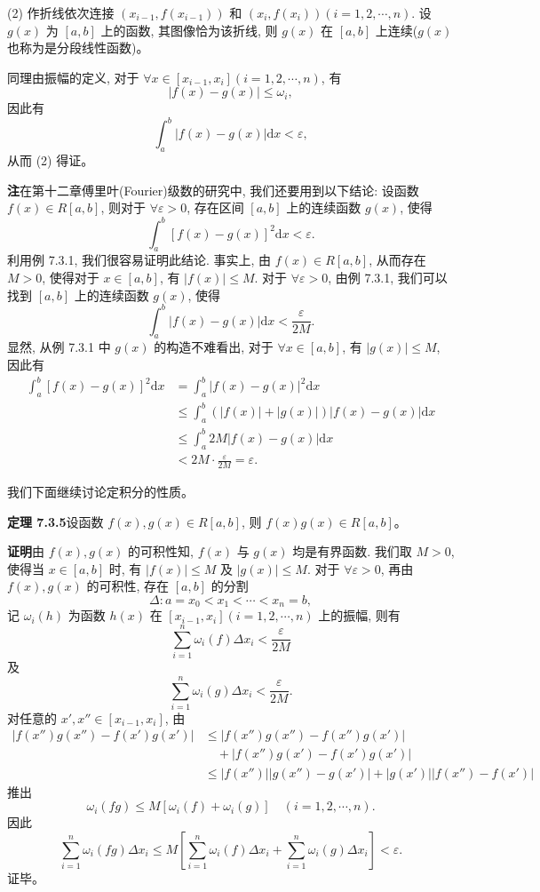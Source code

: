 \documentclass[UTF8, 12pt, fontset=fandol, oneside]{ctexart}
\begin{document}
(2) 作折线依次连接 $(x_{i-1},f(x_{i-1}))$ 和 $(x_i,f(x_i))(i=1,2,\cdots,n)$. 设 $g(x)$ 为 $[a,b]$ 上的函数, 其图像恰为该折线, 则 $g(x)$ 在 $[a,b]$ 上连续($g(x)$ 也称为是分段线性函数)。

同理由振幅的定义, 对于 $\forall x\in[x_{i-1},x_i](i=1,2,\cdots,n)$, 有
\begin{equation}
  |f(x)-g(x)|\leq\omega_i,
  \tag{7.3.4}
\end{equation}
因此有
\[
  \int_a^b |f(x)-g(x)|\mathrm dx<\varepsilon,
\]
从而 (2) 得证。

\noindent\textbf{注}\quad 在第十二章傅里叶(Fourier)级数的研究中, 我们还要用到以下结论: 设函数 $f(x)\in R[a,b]$, 则对于 $\forall\varepsilon>0$, 存在区间 $[a,b]$ 上的连续函数 $g(x)$, 使得
\[
  \int_a^b [f(x)-g(x)]^2\mathrm dx<\varepsilon.
\]
利用例 7.3.1, 我们很容易证明此结论. 事实上, 由 $f(x)\in R[a,b]$, 从而存在 $M>0$, 使得对于 $x\in[a,b]$, 有 $|f(x)|\leq M$. 对于 $\forall\varepsilon>0$, 由例 7.3.1, 我们可以找到 $[a,b]$ 上的连续函数 $g(x)$, 使得
\[
  \int_a^b |f(x)-g(x)|\mathrm dx<\frac{\varepsilon}{2M}.
\]
显然, 从例 7.3.1 中 $g(x)$ 的构造不难看出, 对于 $\forall x\in[a,b]$, 有 $|g(x)|\leq M$, 因此有
\[
\begin{aligned}
  \int_a^b [f(x)-g(x)]^2\mathrm dx
  &=\int_a^b |f(x)-g(x)|^2\mathrm dx\\
  &\leq \int_a^b (|f(x)|+|g(x)|)|f(x)-g(x)|\mathrm dx\\
  &\leq \int_a^b 2M|f(x)-g(x)|\mathrm dx\\
  &<2M\cdot\frac{\varepsilon}{2M}=\varepsilon.
\end{aligned}
\]

我们下面继续讨论定积分的性质。

\noindent\textbf{定理 7.3.5}\quad 设函数 $f(x),g(x)\in R[a,b]$, 则 $f(x)g(x)\in R[a,b]$。

\noindent\textbf{证明}\quad 由 $f(x),g(x)$ 的可积性知, $f(x)$ 与 $g(x)$ 均是有界函数. 我们取 $M>0$, 使得当 $x\in[a,b]$ 时, 有 $|f(x)|\leq M$ 及 $|g(x)|\leq M$. 对于 $\forall\varepsilon>0$, 再由 $f(x),g(x)$ 的可积性, 存在 $[a,b]$ 的分割
\[
  \Delta:a=x_0<x_1<\cdots<x_n=b,
\]
记 $\omega_i(h)$ 为函数 $h(x)$ 在 $[x_{i-1},x_i](i=1,2,\cdots,n)$ 上的振幅, 则有
\begin{equation}
  \sum_{i=1}^n \omega_i(f)\Delta x_i<\frac{\varepsilon}{2M}
  \tag{7.3.5}
\end{equation}
及
\begin{equation}
  \sum_{i=1}^n \omega_i(g)\Delta x_i<\frac{\varepsilon}{2M}.
  \tag{7.3.6}
\end{equation}
对任意的 $x',x''\in[x_{i-1},x_i]$, 由
\[
\begin{aligned}
  |f(x'')g(x'')-f(x')g(x')|
  &\leq |f(x'')g(x'')-f(x'')g(x')|\\
  &\quad+|f(x'')g(x')-f(x')g(x')|\\
  &\leq |f(x'')||g(x'')-g(x')|+|g(x')||f(x'')-f(x')|
\end{aligned}
\]
推出
\[
  \omega_i(fg)\leq M[\omega_i(f)+\omega_i(g)]
  \quad(i=1,2,\cdots,n).
\]
因此
\[
  \sum_{i=1}^n\omega_i(fg)\Delta x_i
  \leq M\left[\sum_{i=1}^n\omega_i(f)\Delta x_i+\sum_{i=1}^n\omega_i(g)\Delta x_i\right]<\varepsilon.
\]
证毕。
\end{document}
